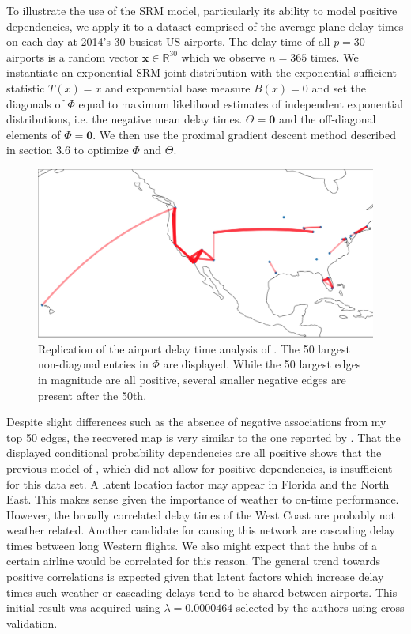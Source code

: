 \documentclass{samkoelleprelimworking}
\begin{document}
 To illustrate the use of the SRM model, particularly its ability to model positive dependencies, we apply it to a dataset comprised of the average plane delay times on each day at 2014's 30 busiest US airports.  The delay time of all $p = 30$ airports is a random vector $\bm{x} \in \mathbb{R}^{30}$ which we observe $n=365$ times.  We instantiate an exponential SRM joint distribution with the exponential sufficient statistic $T(x) = x$ and exponential base measure $B(x) = 0$ and set the diagonals of $\Phi$ equal to maximum likelihood estimates of independent exponential distributions, i.e. the negative mean delay times.  $\Theta = \bm{0}$ and the off-diagonal elements of $\Phi = \bm{0}$.  We then use the proximal gradient descent method described in section 3.6 to optimize $\Phi$ and $\Theta$.  
 
 \begin{figure}\label{fig:map}
\includegraphics[width=\textwidth]{map}
\caption{Replication of the airport delay time analysis of \citep{Inouye}.  The 50 largest non-diagonal entries in $\Phi$ are displayed. While the 50 largest edges in magnitude are all positive, several smaller negative edges are present after the 50th. }
\end{figure}

Despite slight differences such as the absence of negative associations from my top 50 edges, the recovered map is very similar to the one reported by \citep{Inouye2016-hl}.  That the displayed conditional probability dependencies are all positive shows that the previous model of \citep{Yang}, which did not allow for positive dependencies, is insufficient for this data set.  A latent location factor may appear in Florida and the North East.  This makes sense given the importance of weather to on-time performance.  However, the broadly correlated delay times of the West Coast are probably not weather related.  Another candidate for causing this network are cascading delay times between long Western flights. We also might expect that the hubs of a certain airline would be correlated for this reason.  The general trend towards positive correlations is expected given that latent factors which increase delay times such weather or cascading delays tend to be shared between airports. This initial result was acquired using $\lambda = 0.0000464$ selected by the authors using cross validation.
\end{document}
